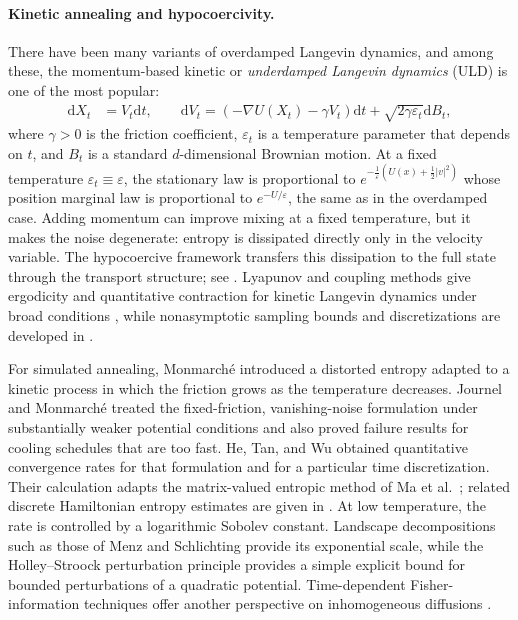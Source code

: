 \documentclass[11pt]{article}
\theoremstyle{definition}
\newcommand{\dd}{\mathrm d}
\newcommand{\eps}{\varepsilon}
\begin{document}
\paragraph{Kinetic annealing and hypocoercivity.}
There have been many variants of overdamped Langevin dynamics, 
and among these, the momentum-based kinetic or \textit{underdamped Langevin dynamics} (ULD) is
one of the most popular:
\begin{align}\label{eqn:ULD}
 \dd X_t&=V_t\dd t,\qquad
 \dd V_t=(-\nabla U(X_t)-\gamma V_t)\dd t
                 +\sqrt{2\gamma\eps_t}\dd B_t,
\end{align}
where $\gamma>0$ is the friction coefficient, $\varepsilon_{t}$ is a temperature parameter
that depends on $t$,
and $B_{t}$ is a standard $d$-dimensional Brownian motion.
At a fixed temperature
$\eps_{t}\equiv\eps$, the stationary law is proportional to $e^{-\frac{1}{\eps}(U(x)+\frac{1}{2}|v|^{2})}$
whose position marginal law is proportional to $e^{-U/\eps}$, 
the same as in the overdamped case.
Adding momentum can improve mixing at a fixed temperature, but it makes the noise
degenerate: entropy is dissipated directly only in the velocity variable. The
hypocoercive framework transfers this dissipation to the full state through the
transport structure; see
\cite{ArnoldEtAl2001,Herau2007,Villani2009}. Lyapunov and coupling methods give
ergodicity and quantitative contraction for kinetic Langevin dynamics under broad
conditions \cite{MattinglyStuartHigham2002,EberleGuillinZimmer2019}, while
nonasymptotic sampling bounds and discretizations are developed in
\cite{ChengEtAl2018,MaEtAl2021}.

For simulated annealing, Monmarch\'e \cite{Monmarche2018} introduced a distorted
entropy adapted to a kinetic process in which the friction grows as the temperature
decreases. Journel and Monmarch\'e \cite{JournelMonmarche2022} treated the
fixed-friction, vanishing-noise formulation under substantially weaker potential
conditions and also proved failure results for cooling schedules that are too fast.
He, Tan, and Wu \cite{HeTanWu2024} obtained quantitative convergence rates for that
formulation and for a particular time discretization. Their calculation adapts the
matrix-valued entropic method of Ma et al.\ \cite{MaEtAl2021}; related discrete
Hamiltonian entropy estimates are given in \cite{Monmarche2024}. At low temperature,
the rate is controlled by a logarithmic Sobolev constant. Landscape decompositions
such as those of Menz and Schlichting \cite{MenzSchlichting2014} provide its
exponential scale, while the
Holley--Stroock perturbation principle \cite{HolleyStroock1987} provides a simple
explicit bound for bounded perturbations of a quadratic potential. Time-dependent
Fisher-information techniques offer another perspective on inhomogeneous diffusions
\cite{FengZuoLi2024}.
\end{document}
